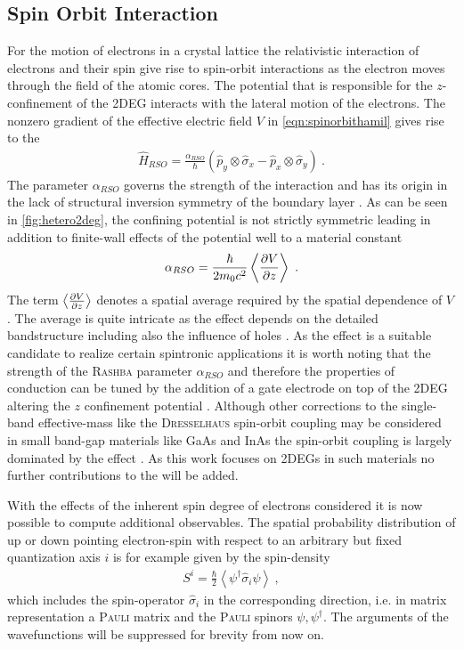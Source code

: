 \subsection{Spin Orbit Interaction}
For the motion of electrons in a crystal lattice the relativistic interaction of electrons and their spin give rise to spin-orbit interactions as the electron moves through the field of the atomic cores.
The potential that is responsible for the $z$-confinement of the 2DEG interacts with the lateral motion of the electrons. The nonzero gradient of the effective electric field $V$ in \cref{eqn:spinorbithamil} gives rise to the \rash{} \hamil{}
\begin{align}
  \hat{H}_{RSO} =\frac{\alpha_{RSO}}{\hbar}(\hat{p}_{y} \otimes \hat{\sigma}_{x} - \hat{p}_{x} \otimes \hat{\sigma}_{y})\ .
	\label{eqn:rashbahamiltonian}
\end{align}
The parameter $\alpha_{RSO}$ governs the strength of the interaction and has its origin in the lack of structural inversion symmetry of the boundary layer \cite{PhysRevB.70.233311}.
As can be seen in \cref{fig:hetero2deg}, the confining potential is not strictly symmetric leading in addition to finite-wall effects of the potential well to a material constant \cite{Metalidis2007Thesis}
\begin{align}
\alpha_{RSO} = \frac{\hbar}{2m_0c^2} \left<\frac{\partial V}{\partial z} \right>\ .
\label{eqn:alpharashba}
\end{align}
The term $\left<\frac{\partial V}{\partial z} \right>$ denotes a spatial average required by the spatial dependence of $V$. The average is quite intricate as the effect depends on the detailed bandstructure including also the influence of holes \cite{JApplPhys.83.4324}.
As the \rash{} effect is a suitable candidate to realize certain spintronic applications it is worth noting that the strength of the \textsc{Rashba} parameter $\alpha_{RSO}$ and therefore the properties of conduction can be tuned by the addition of a gate electrode on top of the 2DEG altering the $z$ confinement potential \cite{PhysRevLett.78.1335}.
Although other corrections to the single-band effective-mass \hamil{} like the \textsc{Dresselhaus} spin-orbit coupling \cite{PhysRev.100.580} may be considered in small band-gap materials like GaAs and InAs the spin-orbit coupling is largely dominated by the \rash{} effect \cite{PhysRevB.61.15588}. As this work focuses on 2DEGs in such materials no further contributions to the \hamil{} will be added.\par
With the effects of the inherent spin degree of electrons considered it is now possible to compute additional observables. The spatial probability distribution of up or down pointing electron-spin with respect to an arbitrary but fixed quantization axis $i$ is for example given by the spin-density \cite{JPhysA:MathGen.18.671}
\begin{align}
S^i  = \frac{\hbar}{2} \left< \psi^{\dagger} \hat{\sigma}_i \psi \right>\ ,
\label{eqn:spindensity}
\end{align}
which includes the spin-operator $\hat{\sigma}_i$ in the corresponding direction, i.e. in matrix representation a \textsc{Pauli} matrix and the \textsc{Pauli} spinors $\psi,\psi^{\dagger}$. The arguments of the wavefunctions will be suppressed for brevity from now on.
